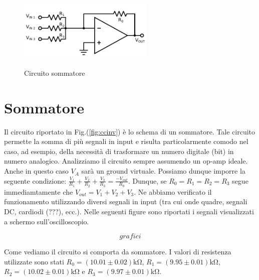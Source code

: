 \begin{figure}
	\caption{Circuito sommatore}
	\includegraphics[width=65mm]{ccsum.pdf}
	\label{fig:ccsum}
\end{figure}

\section{Sommatore}

Il circuito riportato in Fig.(\ref{fig:ccinv}) è lo schema di un sommatore.
Tale circuito permette la somma di più segnali in input e risulta particolarmente comodo nel caso, ad esempio, della necessità di trasformare un numero digitale (bit) in numero analogico.
Analizziamo il circuito sempre assumendo un op-amp ideale.
Anche in questo caso $V_A$ sarà un ground virtuale.
Possiamo dunque imporre la seguente condizione: $\frac{V_1}{R_1}+\frac{V_2}{R_2}+\frac{V_3}{R_3}=\frac{-V_{out}}{R_0}$.
Dunque, se $R_0=R_1=R_2=R_3$ segue immediamtamente che $V_{out}=V_1+V_2+V_3$.
Ne abbiamo verificato il funzionamento utilizzando diversi segnali in input (tra cui onde quadre, segnali DC, cardiodi (???), ecc.).
Nelle seguenti figure sono riportati i segnali visualizzati a schermo sull'oscilloscopio.

$$grafici$$

Come vediamo il circuito si comporta da sommatore. I valori di resistenza utilizzate sono stati $R_0=(10.01\pm0.02)\si{\kilo\ohm}$, $R_1=(9.95\pm0.01)\si{\kilo\ohm}$, $R_2=(10.02\pm 0.01)\si{\kilo\ohm}$ e $R_3=(9.97\pm0.01)\si{\kilo\ohm}$.